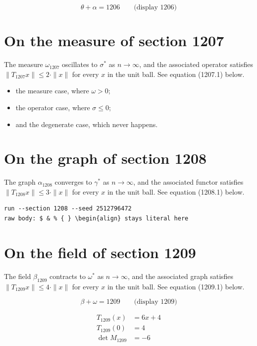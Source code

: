 \documentclass{article}
\begin{document}
$$
\theta + \alpha = 1206 \qquad \text{(display 1206)}
$$

\section{On the measure of section 1207}
The measure $\omega_{1207}$ oscillates to $\sigma^{*}$ as $n \to \infty$,
and the associated operator satisfies $\|T_{1207} x\| \leq 2 \cdot \|x\|$
for every $x$ in the unit ball. See equation (1207.1) below.

\begin{itemize}
  \item the measure case, where $\omega > 0$;
  \item the operator case, where $\sigma \leq 0$;
  \item and the degenerate case, which never happens.
\end{itemize}

\section{On the graph of section 1208}
The graph $\alpha_{1208}$ converges to $\gamma^{*}$ as $n \to \infty$,
and the associated functor satisfies $\|T_{1208} x\| \leq 3 \cdot \|x\|$
for every $x$ in the unit ball. See equation (1208.1) below.

\begin{verbatim}
run --section 1208 --seed 2512796472
raw body: $ & % { } \begin{align} stays literal here
\end{verbatim}

\section{On the field of section 1209}
The field $\beta_{1209}$ contracts to $\omega^{*}$ as $n \to \infty$,
and the associated graph satisfies $\|T_{1209} x\| \leq 4 \cdot \|x\|$
for every $x$ in the unit ball. See equation (1209.1) below.

$$
\beta + \omega = 1209 \qquad \text{(display 1209)}
$$

\begin{align}
T_{1209}(x) &= 6 x + 4 \\
T_{1209}(0) &= 4 \\
\det M_{1209} &= -6
\end{align}
\end{document}

